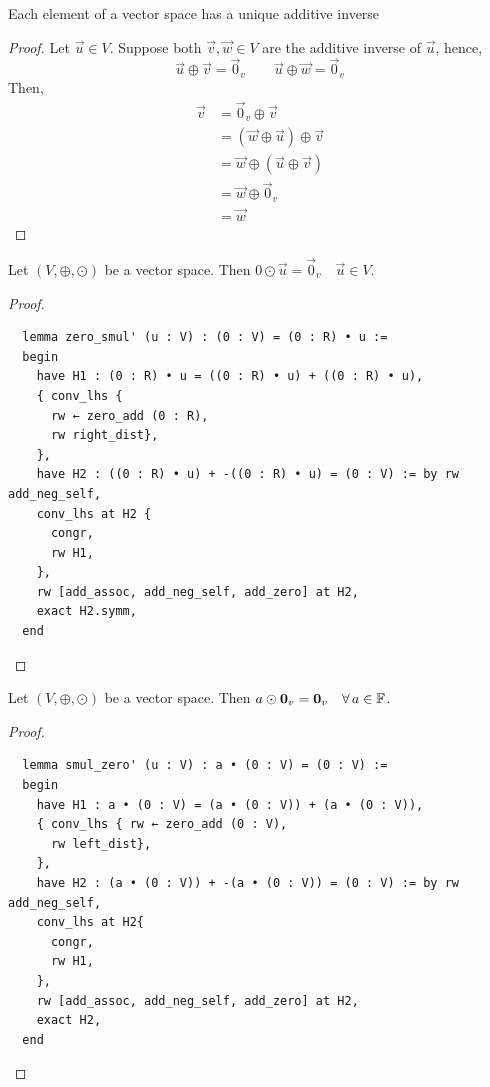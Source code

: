 \documentclass{article}
\begin{document}
\begin{nlemma}
  Each element of a vector space has a unique additive inverse
\end{nlemma}
\begin{proof}
  Let $\vec u \in V$. Suppose both $\vec v, \vec w \in V$ are the additive inverse of $\vec u$, hence,
  $$ \vec u \oplus \vec v = \vec 0_v \qquad \vec u \oplus \vec w = \vec 0_v $$
  Then,
  \begin{align*}
    \vec v &= \vec 0_v \oplus \vec v\\
    &= (\vec w \oplus \vec u) \oplus \vec v\\
    &= \vec w \oplus (\vec u \oplus \vec v)\\
    &= \vec w \oplus \vec 0_v\\
    &= \vec w
  \end{align*}
\end{proof}

\begin{nlemma}
  Let $(V, \oplus,\odot)$ be a vector space. Then $0 \odot \vec u = \vec 0_v \quad \vec u \in V$.
\end{nlemma}
\begin{proof}
  \begin{lstlisting}
  lemma zero_smul' (u : V) : (0 : V) = (0 : R) • u :=
  begin
    have H1 : (0 : R) • u = ((0 : R) • u) + ((0 : R) • u),
    { conv_lhs {
      rw ← zero_add (0 : R),
      rw right_dist},
    },
    have H2 : ((0 : R) • u) + -((0 : R) • u) = (0 : V) := by rw add_neg_self,
    conv_lhs at H2 {
      congr,
      rw H1,
    },
    rw [add_assoc, add_neg_self, add_zero] at H2,
    exact H2.symm,
  end
  \end{lstlisting}
\end{proof}

\begin{nlemma}
  Let $(V, \oplus,\odot)$ be a vector space. Then $a \odot \boldsymbol{\mathbf{0}}_v = \boldsymbol{\mathbf{0}}_v \quad\forall\, a\in\mathbb{F}$.
\end{nlemma}

\begin{proof}
\begin{lstlisting}
  lemma smul_zero' (u : V) : a • (0 : V) = (0 : V) :=
  begin
    have H1 : a • (0 : V) = (a • (0 : V)) + (a • (0 : V)),
    { conv_lhs { rw ← zero_add (0 : V),
      rw left_dist},
    },
    have H2 : (a • (0 : V)) + -(a • (0 : V)) = (0 : V) := by rw add_neg_self,
    conv_lhs at H2{
      congr,
      rw H1,
    },
    rw [add_assoc, add_neg_self, add_zero] at H2,
    exact H2,
  end
  \end{lstlisting}
\end{proof}
\end{document}
